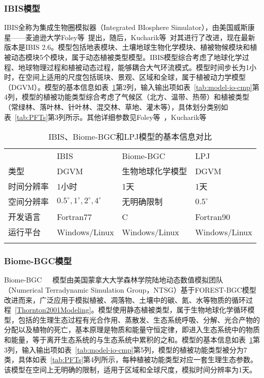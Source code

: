 \subsubsection{IBIS模型}
IBIS全称为集成生物圈模拟器（Integrated BIosphere Simulator），由美国威斯康星——麦迪逊大学Foley等~\cite{foley1996integrated}提出，随后，Kucharik等~\cite{Kucharik2000Testing}对其进行了改进，现在最新版本是IBIS 2.6。模型包括地表模块、土壤地球生物化学模块、植被物候模块和植被动态模块5个模块，属于动态植被类型模型。IBIS模型综合考虑了地球化学过程、地球物理过程和植被动态过程，能够耦合大气环流模式。模型时间步长为1小时，在空间上适用的尺度包括斑块、景观、区域和全球，属于植被动力学模型（DGVM）。模型的基本信息如表~\ref{tab:model-basic-cmp}第2列，输入输出项如表~\ref{tab:model-io-cmp}第4列，模型的植被功能类型综合考虑了气候区（北方、温带、热带）和植被类型（常绿林、落叶林、针叶林、混交林、草地、灌木等），具体划分类别如表~\ref{tab:PFTs}第3列所示。其他详细参数见Foley等~\cite{foley1996integrated}，Kucharik等~\cite{Kucharik2000Testing}

\begin{table}[H]
    \centering
    \caption{IBIS、Biome-BGC和LPJ模型的基本信息对比}
    \label{tab:model-basic-cmp}
    \begin{threeparttable}
        \begin{tabular}{llll}
            \Xhline{1.5pt}
             & IBIS & Biome-BGC & LPJ \\
            \Xhline{1pt}
            类型 & DGVM & 生物地球化学模型 & DGVM \\
            时间分辨率 & 1小时 & 1天 & 1天 \\
            空间分辨率 & $0.5^{\circ}, 1^{\circ}, 2^{\circ}, 4^{\circ}$ & 无明确限制 & $0.5^{\circ}$ \\
            开发语言 & Fortran77 & C & Fortran90 \\
            运行平台 & Windows/Linux & Windows/Linux & Windows/Linux \\
            \Xhline{1.5pt}
        \end{tabular}
    \end{threeparttable}
\end{table}

\subsubsection{Biome-BGC模型}
Biome-BGC~\cite{thornton1998regional}~\cite{kimball1997simulating}~\cite{white2000parameterization}模型由美国蒙拿大大学森林学院陆地动态数值模拟团队（Numerical Terradynamic Simulation Group，NTSG）基于FOREST-BGC模型改进而来，广泛应用于模拟植被、凋落物、土壤中的碳、氮、水等物质的循环过程~\ref{Thornton2001Modeling}。模型使用静态植被类型，属于生物地球化学循环模型，包括的生理生态过程有光合作用、蒸散发、生态系统呼吸、分解、光合产物的分配以及植物的死亡，基本原理是物质和能量守恒定律，即进入生态系统中的物质和能量，等于离开生态系统的与生态系统中累积的之和。模型的基本信息如表~\ref{tab:model-basic-cmp}第3列，输入输出项如表~\ref{tab:model-io-cmp}第5列，模型的植被功能类型被分为7类，具体如表~\ref{tab:PFTs}第4列所示，每种植被功能类型对应一套生理生态参数。该模型在空间上无明确的限制，适用于区域和全球尺度，模拟时间分辨率为1天。

